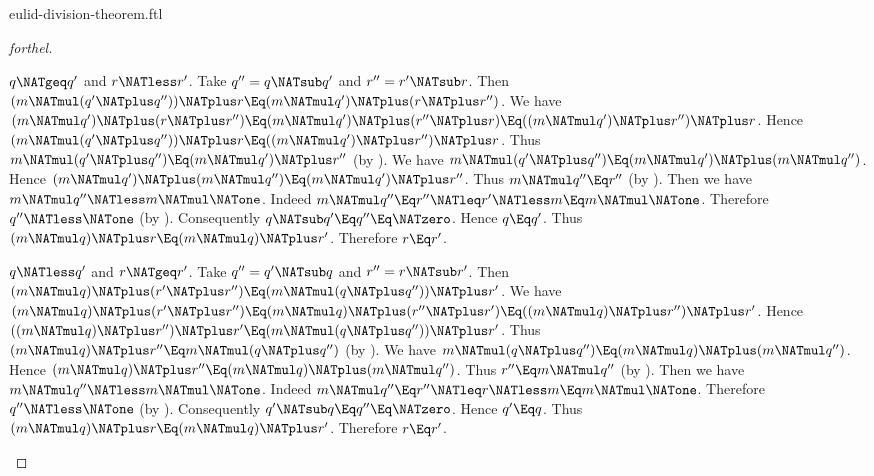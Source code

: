 \documentclass{stex}
\begin{document}
\begin{smodule}{eulid-division-theorem.ftl}
\begin{proof}[forthel]
  \begin{case}{$q \NATgeq q'$ and $r \NATless r'$.}
    Take $q'' = q \NATsub q'$ and $r'' = r' \NATsub r$.
    Then $(m \NATmul (q' \NATplus q'')) \NATplus r \Eq (m \NATmul q') \NATplus (r \NATplus r'')$.
    We have $(m \NATmul q') \NATplus (r \NATplus r'')
      \Eq (m \NATmul q') \NATplus (r'' \NATplus r)
      \Eq ((m \NATmul q') \NATplus r'') \NATplus r$.
    Hence $(m \NATmul (q' \NATplus q'')) \NATplus r \Eq ((m \NATmul q') \NATplus r'') \NATplus r$.
    Thus $m \NATmul (q' \NATplus q'') \Eq (m \NATmul q') \NATplus r''$ (by ).
    We have $m \NATmul (q' \NATplus q'') \Eq (m \NATmul q') \NATplus (m \NATmul q'')$.
    Hence $(m \NATmul q') \NATplus (m \NATmul q'') \Eq (m \NATmul q') \NATplus r''$.
    Thus $m \NATmul q'' \Eq r''$ (by ).
    Then we have $m \NATmul q'' \NATless m \NATmul \NATone$.
    Indeed $m \NATmul q''
      \Eq r''
      \NATleq r'
      \NATless m
      \Eq m \NATmul \NATone$.
    Therefore $q'' \NATless \NATone$ (by ).
    Consequently $q \NATsub q' \Eq q'' \Eq \NATzero$.
    Hence $q \Eq q'$.
    Thus $(m \NATmul q) \NATplus r \Eq (m \NATmul q) \NATplus r'$.
    Therefore $r \Eq r'$.
  \end{case}

  \begin{case}{$q \NATless q'$ and $r \NATgeq r'$.}
    Take $q'' = q' \NATsub q$ and $r'' = r \NATsub r'$.
    Then $(m \NATmul q) \NATplus (r' \NATplus r'') \Eq (m \NATmul (q \NATplus q'')) \NATplus r'$.
    We have $(m \NATmul q) \NATplus (r' \NATplus r'')
      \Eq (m \NATmul q) \NATplus (r'' \NATplus r')
      \Eq ((m \NATmul q) \NATplus r'') \NATplus r'$.
    Hence $((m \NATmul q) \NATplus r'') \NATplus r' \Eq (m \NATmul (q \NATplus q'')) \NATplus r'$.
    Thus $(m \NATmul q) \NATplus r'' \Eq m \NATmul (q \NATplus q'')$ (by ).
    We have $m \NATmul (q \NATplus q'') \Eq (m \NATmul q) \NATplus (m \NATmul q'')$.
    Hence $(m \NATmul q) \NATplus r'' \Eq (m \NATmul q) \NATplus (m \NATmul q'')$.
    Thus $r'' \Eq m \NATmul q''$ (by ).
    Then we have $m \NATmul q'' \NATless m \NATmul \NATone$.
    Indeed $m \NATmul q''
      \Eq r''
      \NATleq r
      \NATless m
      \Eq m \NATmul \NATone$.
    Therefore $q'' \NATless \NATone$ (by ).
    Consequently $q' \NATsub q \Eq q'' \Eq \NATzero$.
    Hence $q' \Eq q$.
    Thus $(m \NATmul q) \NATplus r \Eq (m \NATmul q) \NATplus r'$.
    Therefore $r \Eq r'$.
  \end{case}


\end{proof}
\end{smodule}
\end{document}
